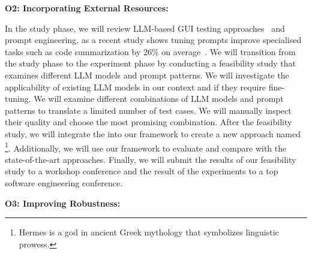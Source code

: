 

\smallskip
\noindent
\textbf{O2: Incorporating External Resources:}  

\noindent
In the study phase, we will review LLM-based GUI testing approaches~\cite{Zimmermann:GPT3GUITest:2023:ICSTW, liu:GUIInputLLM:ICSE:2023} and prompt engineering, as a recent study shows tuning prompts improve specialised tasks such as code summarization  by 26\% on average~\cite{wang:prompt:FSE:2023}.
We will transition from the study phase to the experiment phase by conducting a feasibility study that examines different LLM models and prompt patterns.
We will investigate the applicability of existing LLM models in our context and if they require fine-tuning.
We will examine different combinations of LLM models and prompt patterns to translate a limited number of test cases.
We will manually inspect their quality and choose the most promising combination.
After the feasibility study, we will integrate the \llmtranslator into our framework to create a new \testreuse approach named \llmtool\footnote{Hermes is a god in ancient Greek mythology that symbolizes linguistic prowess.}.
Additionally, we will use our \tme framework to evaluate \llmtool and compare with the state-of-the-art \testreuse approaches.
Finally, we will submit the results of our  feasibility study to a workshop conference and the result of the \testreuse experiments to a top software engineering conference. 




\smallskip
\noindent
\textbf{O3: Improving Robustness:}  

